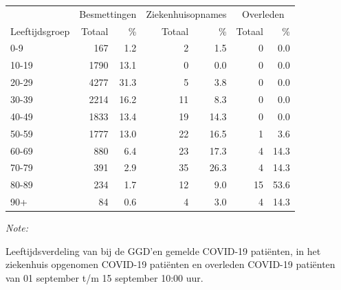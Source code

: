 \documentclass[
  english,
  man,floatsintext]{apa6}
\begin{document}
\begin{table}[H]
\centering\begingroup\fontsize{11}{13}\selectfont

\begin{threeparttable}
\begin{tabular}{lrrrrrr}
\toprule
\multicolumn{1}{c}{ } & \multicolumn{2}{c}{Besmettingen} & \multicolumn{2}{c}{Ziekenhuisopnames} & \multicolumn{2}{c}{Overleden} \\
\cmidrule(l{3pt}r{3pt}){2-3} \cmidrule(l{3pt}r{3pt}){4-5} \cmidrule(l{3pt}r{3pt}){6-7}
Leeftijdsgroep & Totaal & \% & Totaal & \% & Totaal & \%\\
\midrule
0-9 & 167 & 1.2 & 2 & 1.5 & 0 & 0.0\\
10-19 & 1790 & 13.1 & 0 & 0.0 & 0 & 0.0\\
20-29 & 4277 & 31.3 & 5 & 3.8 & 0 & 0.0\\
30-39 & 2214 & 16.2 & 11 & 8.3 & 0 & 0.0\\
40-49 & 1833 & 13.4 & 19 & 14.3 & 0 & 0.0\\
50-59 & 1777 & 13.0 & 22 & 16.5 & 1 & 3.6\\
60-69 & 880 & 6.4 & 23 & 17.3 & 4 & 14.3\\
70-79 & 391 & 2.9 & 35 & 26.3 & 4 & 14.3\\
80-89 & 234 & 1.7 & 12 & 9.0 & 15 & 53.6\\
90+ & 84 & 0.6 & 4 & 3.0 & 4 & 14.3\\
\bottomrule
\end{tabular}
\begin{tablenotes}
\item \textit{Note: } 
\item Leeftijdsverdeling van bij de GGD’en gemelde COVID-19 patiënten, in het ziekenhuis opgenomen COVID-19 patiënten en overleden COVID-19 patiënten van 01 september t/m 15 september 10:00 uur.
\end{tablenotes}
\end{threeparttable}
\endgroup{}
\end{table}
\end{document}
